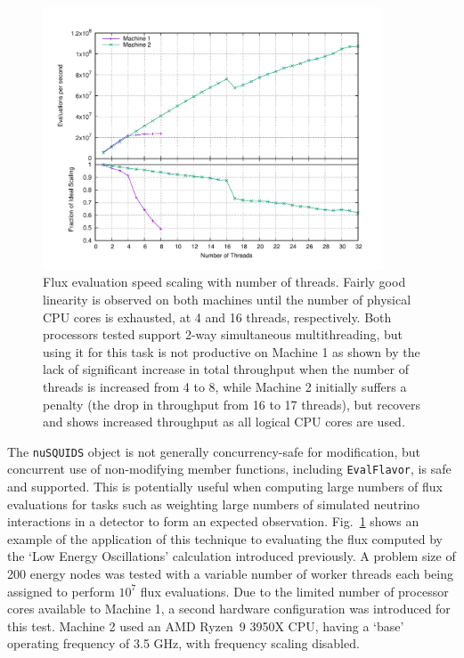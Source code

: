 \documentclass[3p,12pt]{elsarticle}
\begin{document}
\begin{figure}[t]
  \centering
  \includegraphics[width=0.9\textwidth]{fig/evaluation-concurrency-scaling.pdf}
  \caption{Flux evaluation speed scaling with number of threads. Fairly good linearity is observed on both machines until the number of physical CPU cores is exhausted, at 4 and 16 threads, respectively. Both processors tested support 2-way simultaneous multithreading, but using it for this task is not productive on Machine 1 as shown by the lack of significant increase in total throughput when the number of threads is increased from 4 to 8, while Machine 2 initially suffers a penalty (the drop in throughput from 16 to 17 threads), but recovers and shows increased throughput as all logical CPU cores are used. }
  \label{fig:evaluation_threads}
\end{figure}

The \lstinline{nuSQUIDS} object is not generally concurrency-safe for modification, but concurrent use of non-modifying member functions, including \lstinline{EvalFlavor}, is safe and supported. 
This is potentially useful when computing large numbers of flux evaluations for tasks such as weighting large numbers of simulated neutrino interactions in a detector to form an expected observation. 
Fig.~\ref{fig:evaluation_threads} shows an example of the application of this technique to evaluating the flux computed by the `Low Energy Oscillations' calculation introduced previously. 
A problem size of 200 energy nodes was tested with a variable number of worker threads each being assigned to perform $10^7$ flux evaluations. 
Due to the limited number of processor cores available to Machine 1, a second hardware configuration was introduced for this test. 
Machine 2 used an AMD Ryzen\texttrademark~9 3950X CPU, having a `base' operating frequency of 3.5 GHz, with frequency scaling disabled. 
\end{document}
